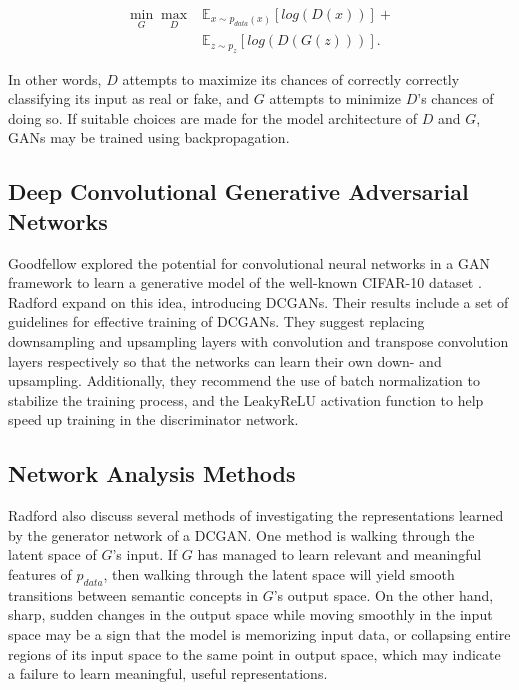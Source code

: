 \documentclass[10pt,twocolumn,letterpaper]{article}
\begin{document}
\begin{equation}
\begin{aligned}
\min_{G} \max_{D}  & \mathbb{E}_{x \sim p_{data}(x)}[log(D(x))]	+ \\
				   & \mathbb{E}_{z \sim p_{z}}[log(D(G(z)))].
\end{aligned}
\end{equation}

In other words, $ D $ attempts to maximize its chances of correctly correctly classifying its input
as real or fake, and $ G $ attempts to minimize $ D $'s chances of doing so. If suitable choices
are made for the model architecture of $ D $ and $ G $, GANs may be trained using backpropagation.

\subsection{Deep Convolutional Generative Adversarial Networks}
Goodfellow \etal \cite{goodfellow2014generative} explored the potential for convolutional neural
networks in a GAN framework to learn a generative model of the well-known CIFAR-10 dataset
\cite{krizhevsky2014cifar}. Radford \etal \cite{radford2015unsupervised} expand on this idea,
introducing DCGANs. Their results include a set of guidelines for effective training of
DCGANs. They suggest replacing downsampling and upsampling layers with convolution and transpose
convolution layers respectively so that the networks can learn their own down- and upsampling. Additionally, they recommend the use of batch normalization to stabilize the training process, and the LeakyReLU activation function \cite{maas2013rectifier} to help speed up training in the discriminator network.

\subsection{Network Analysis Methods}
Radford \etal also discuss several methods of investigating the representations learned by the generator
network of a DCGAN. One method is walking through the latent space of $ G $'s input. If $ G $ has managed
to learn relevant and meaningful features of $ p_{data} $, then walking through the latent space will
yield smooth transitions between semantic concepts in $ G $'s output space. On the other hand, sharp, sudden changes in the output space while moving smoothly in the input space may be a sign that the model is memorizing input data, or collapsing entire regions of its input space to the same point in output space, which may indicate a failure to learn meaningful, useful representations.
\end{document}
